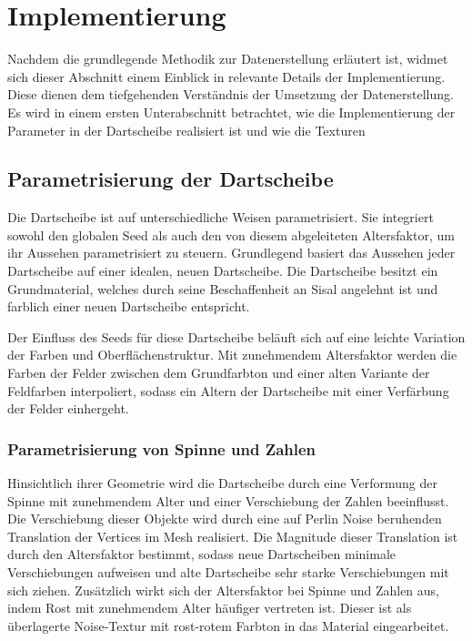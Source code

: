 
\section{Implementierung}
\label{sec:daten:implementierung}

Nachdem die grundlegende Methodik zur Datenerstellung erläutert ist, widmet sich dieser Abschnitt einem Einblick in relevante Details der Implementierung. Diese dienen dem tiefgehenden Verständnis der Umsetzung der Datenerstellung. Es wird in einem ersten Unterabschnitt betrachtet, wie die Implementierung der Parameter in der Dartscheibe realisiert ist und wie die Texturen


\subsection{Parametrisierung der Dartscheibe}  %
\label{sec:dartscheibe_parametrisierung}

Die Dartscheibe ist auf unterschiedliche Weisen parametrisiert. Sie integriert sowohl den globalen Seed als auch den von diesem abgeleiteten Altersfaktor, um ihr Aussehen parametrisiert zu steuern. Grundlegend basiert das Aussehen jeder Dartscheibe auf einer idealen, neuen Dartscheibe. Die Dartscheibe besitzt ein Grundmaterial, welches durch seine Beschaffenheit an Sisal angelehnt ist und farblich einer neuen Dartscheibe entspricht.

Der Einfluss des Seeds für diese Dartscheibe beläuft sich auf eine leichte Variation der Farben und Oberflächenstruktur. Mit zunehmendem Altersfaktor werden die Farben der Felder zwischen dem Grundfarbton und einer alten Variante der Feldfarben interpoliert, sodass ein Altern der Dartscheibe mit einer Verfärbung der Felder einhergeht.

\subsubsection{Parametrisierung von Spinne und Zahlen}

Hinsichtlich ihrer Geometrie wird die Dartscheibe durch eine Verformung der Spinne mit zunehmendem Alter und einer Verschiebung der Zahlen beeinflusst. Die Verschiebung dieser Objekte wird durch eine auf Perlin Noise beruhenden Translation der Vertices im Mesh realisiert. Die Magnitude dieser Translation ist durch den Altersfaktor bestimmt, sodass neue Dartscheiben minimale Verschiebungen aufweisen und alte Dartscheibe sehr starke Verschiebungen mit sich ziehen. Zusätzlich wirkt sich der Altersfaktor bei Spinne und Zahlen aus, indem Rost mit zunehmendem Alter häufiger vertreten ist. Dieser ist als überlagerte Noise-Textur mit rost-rotem Farbton in das Material eingearbeitet.


